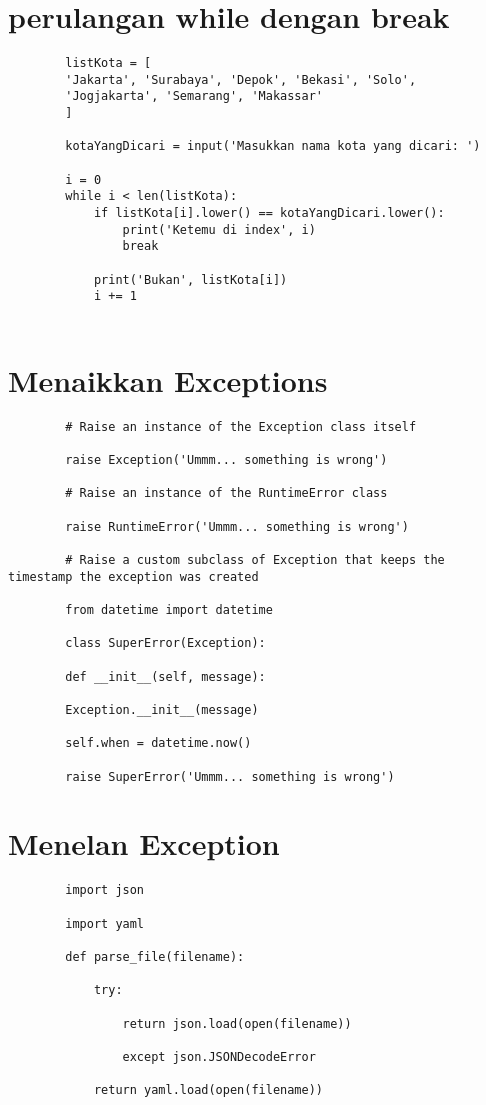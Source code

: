 \documentclass{article}
\begin{document}
	\section {perulangan while dengan break}
	\begin{lstlisting}
		listKota = [
		'Jakarta', 'Surabaya', 'Depok', 'Bekasi', 'Solo',
		'Jogjakarta', 'Semarang', 'Makassar'
		]
		
		kotaYangDicari = input('Masukkan nama kota yang dicari: ')
		
		i = 0
		while i < len(listKota):
			if listKota[i].lower() == kotaYangDicari.lower():
				print('Ketemu di index', i)
				break
		
			print('Bukan', listKota[i])
			i += 1
	
	\end{lstlisting}
	
	\section {Menaikkan Exceptions}
	\begin{lstlisting}
		# Raise an instance of the Exception class itself
		
		raise Exception('Ummm... something is wrong')
		
		# Raise an instance of the RuntimeError class
		
		raise RuntimeError('Ummm... something is wrong')
		
		# Raise a custom subclass of Exception that keeps the timestamp the exception was created
		
		from datetime import datetime
		
		class SuperError(Exception):
		
		def __init__(self, message):
		
		Exception.__init__(message)
		
		self.when = datetime.now()
		
		raise SuperError('Ummm... something is wrong')
	\end{lstlisting}
	
	\section {Menelan Exception}
	\begin{lstlisting}
		import json
		
		import yaml
		
		def parse_file(filename):
		
			try:
			
				return json.load(open(filename))
				
				except json.JSONDecodeError
		
			return yaml.load(open(filename))
	\end{lstlisting}
	
\end{document}
